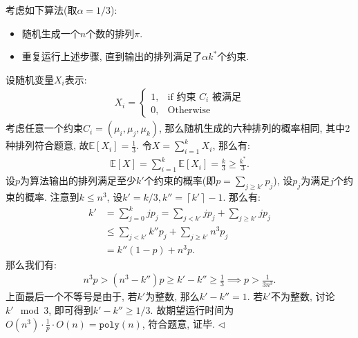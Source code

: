 \documentclass[11pt]{article}
\newenvironment{answer}[1][Solution]{\begin{trivlist}
\item[\hskip \labelsep{\bfseries#1.}\hskip \labelsep]}{\hfill$\lhd$\end{trivlist}}
\newcommand\E{\mathbb{E}}
\begin{document}
\begin{answer}
    考虑如下算法(取$\alpha = 1/3$):
    \begin{itemize}
        \item 随机生成一个$n$个数的排列$\pi$.
        \item 重复运行上述步骤, 直到输出的排列满足了$\alpha k^*$个约束.
    \end{itemize}
    设随机变量$X_{i}$表示:
    \begin{align*}
        X_i = \begin{cases}
            1, & \text{if } \text{约束 } C_i \text{ 被满足} \\
            0, & \text{Otherwise}
        \end{cases}
    \end{align*}
    考虑任意一个约束$C_i = (\mu_i, \mu_j, \mu_k)$, 那么随机生成的六种排列的概率相同, 其中2种排列符合题意, 故$\E[X_i] = \frac{1}{3}$. 令$X = \sum_{i=1}^k X_i$, 那么有:
    \begin{align*}
        \E[X] = \sum_{i=1}^k \E[X_i] = \frac{k}{3} \ge \frac{k^*}{3}.
    \end{align*}
    设$p$为算法输出的排列满足至少$k'$个约束的概率(即$p = \sum_{j\ge k'}p_j$), 设$p_j$为满足$j$个约束的概率. 注意到$k \le n^3$, 设$k' = k/3, k'' = \left\lceil k' \right\rceil - 1$. 那么有:
    \begin{align*}
        k' &= \sum_{j=0}^{k} jp_j = \sum_{j < k'} j p_j + \sum_{j \ge k'} j p_j \\
        &\le \sum_{j < k'} k'' p_j + \sum_{j \ge k'} n^3 p_j \\
        &= k''(1-p) + n^3 p.
    \end{align*}
    那么我们有:
    \begin{align*}
        n^3 p > (n^3 - k'') p \ge k' - k'' \ge \frac{1}{3} \implies p > \frac{1}{3n^3}. 
    \end{align*}
    上面最后一个不等号是由于, 若$k'$为整数, 那么$k' - k'' = 1$. 若$k'$不为整数, 讨论$k'\mod 3$, 即可得到$k' - k'' \ge 1/3$. 故期望运行时间为$O(n^3)\cdot \frac{1}{p} \cdot O(n) = \texttt{poly}(n)$, 符合题意, 证毕. 
\end{answer}
\end{document}
